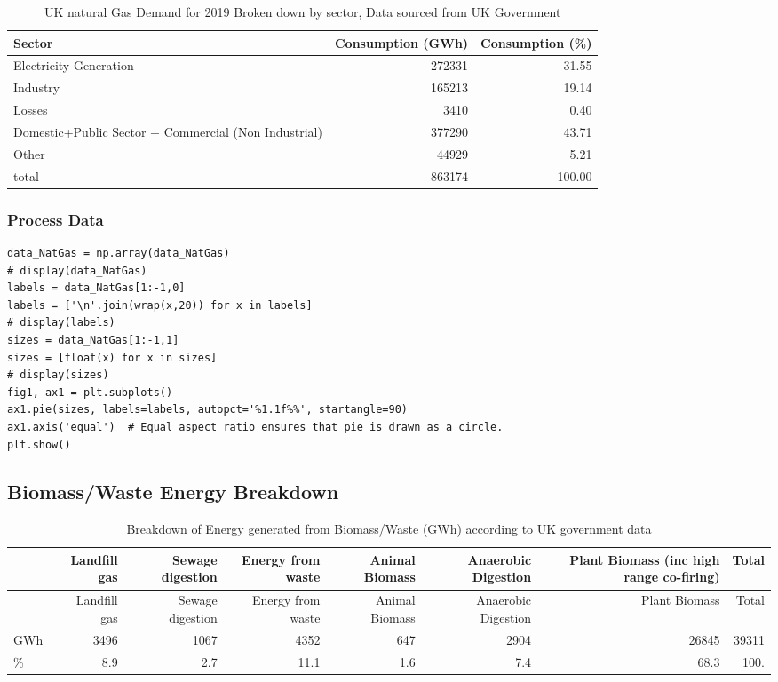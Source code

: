 \documentclass[11pt]{article}
\numberwithin{equation}{section}
\begin{document}
\begin{table}[H]
\caption{\label{tabNatGasDemandBreakdown}UK natural Gas Demand for 2019 Broken down by sector, Data sourced from UK Government \cite{NaturalGas}}
\centering
\begin{tabular}{lrr}
\toprule
Sector & Consumption (GWh) & Consumption (\%)\\
\midrule
Electricity Generation & 272331 & 31.55\\
Industry & 165213 & 19.14\\
Losses & 3410 & 0.40\\
Domestic+Public Sector + Commercial (Non Industrial) & 377290 & 43.71\\
Other & 44929 & 5.21\\
\midrule
total & 863174 & 100.00\\
\bottomrule
\end{tabular}
\end{table}

\subsubsection{Process Data}
\label{sec:org78350e1}
\begin{verbatim}
data_NatGas = np.array(data_NatGas)
# display(data_NatGas)
labels = data_NatGas[1:-1,0]
labels = ['\n'.join(wrap(x,20)) for x in labels]
# display(labels)
sizes = data_NatGas[1:-1,1]
sizes = [float(x) for x in sizes]
# display(sizes)
fig1, ax1 = plt.subplots()
ax1.pie(sizes, labels=labels, autopct='%1.1f%%', startangle=90)
ax1.axis('equal')  # Equal aspect ratio ensures that pie is drawn as a circle.
plt.show()
\end{verbatim}

\subsection{Biomass/Waste Energy Breakdown \label{secAppBiomassWasteEner}}
\label{sec:orge1c1ab7}
\begin{table}[H]
\caption{\label{tabBiomassBreakdown}Breakdown of Energy generated from Biomass/Waste (GWh) according to UK government data \cite{RenewableElecricityCap}}
\centering
\tiny
\begin{tabular}{lrrrrrrr}
\toprule
 & Landfill gas & Sewage digestion & Energy from waste & Animal Biomass & Anaerobic Digestion & Plant Biomass (inc high range co-firing) & Total\\
\midrule
 & Landfill gas & Sewage digestion & Energy from waste & Animal Biomass & Anaerobic Digestion & Plant Biomass & Total\\
GWh & 3496 & 1067 & 4352 & 647 & 2904 & 26845 & 39311\\
\% & 8.9 & 2.7 & 11.1 & 1.6 & 7.4 & 68.3 & 100.\\
\bottomrule
\end{tabular}
\end{table}
\end{document}
